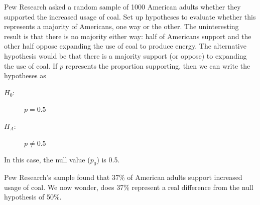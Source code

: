 
\begin{example}{Pew Research asked a random sample of 1000 American
    adults whether they supported the increased usage of
    coal. Set up hypotheses to evaluate whether this represents
    a majority of Americans, one way or the other.}
  The uninteresting result is that there is no majority either way:
  half of Americans support and the other half oppose expanding the
  use of coal to produce energy. The alternative hypothesis would
  be that there is a majority support (or oppose) to expanding the
  use of coal. If $p$ represents the proportion supporting, then
  we can write the hypotheses as
  \begin{description}
    \item[$H_0$:] $p = 0.5$
    \item[$H_A$:] $p \neq 0.5$
  \end{description}
  In this case, the null value ($p_0$) is 0.5.
\end{example}

Pew Research's sample found that 37\% of American adults support
increased usage of coal. We now wonder, does 37\% represent a
real difference from the null hypothesis of 50\%.

